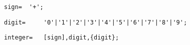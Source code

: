 \documentclass{article}
\begin{document}
    \begin{lstlisting}[mathescape=true]
     sign= 	'+';
    \end{lstlisting}
    
    \begin{lstlisting}[mathescape=true]
     digit= 	'0'|'1'|'2'|'3'|'4'|'5'|'6'|'7'|'8'|'9';
    \end{lstlisting}
    
    \begin{lstlisting}[mathescape=true]
     integer= 	[sign],digit,{digit};
    \end{lstlisting}
    
\end{document}
